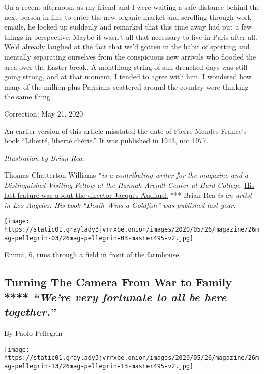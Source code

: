 On a recent afternoon, as my friend and I were waiting a safe distance
behind the next person in line to enter the new organic market and
scrolling through work emails, he looked up suddenly and remarked that
this time away had put a few things in perspective: Maybe it wasn't all
that necessary to live in Paris after all. We'd already laughed at the
fact that we'd gotten in the habit of spotting and mentally separating
ourselves from the conspicuous new arrivals who flooded the area over
the Easter break. A monthlong string of sun-drenched days was still
going strong, and at that moment, I tended to agree with him. I wondered
how many of the million-plus Parisians scattered around the country were
thinking the same thing.

Correction: May 21, 2020

An earlier version of this article misstated the date of Pierre Mendès
France's book ``Liberté, liberté chérie.'' It was published in 1943, not
1977.

\emph{Illustration by Brian Rea.}

Thomas Chatterton Williams *\emph{is a contributing writer for the
magazine and a Distinguished Visiting Fellow at the Hannah Arendt Center
at Bard College.}
\href{https://www.nytimes3xbfgragh.onion/2018/10/11/magazine/jacques-audiard-french-scorsese-sisters-brothers.html}{His
last feature was about the director Jacques Audiard.} *** Brian Rea
\emph{is an artist in Los Angeles. His book ``Death Wins a Goldfish''
was published last year.}

\texttt{[image: https://static01.graylady3jvrrxbe.onion/images/2020/05/26/magazine/26mag-pellegrin-03/26mag-pellegrin-03-master495-v2.jpg]}

Emma, 6, runs through a field in front of the farmhouse.

\hypertarget{turning-the-camera-from-war-to-family--were-very-fortunate-to-all-be-here-together}{%
\subsection{\texorpdfstring{Turning The Camera From War to Family ****
\emph{``We're very fortunate to all be here
together.''}}{Turning The Camera From War to Family **** ``We're very fortunate to all be here together.''}}\label{turning-the-camera-from-war-to-family--were-very-fortunate-to-all-be-here-together}}

By Paolo Pellegrin

\texttt{[image: https://static01.graylady3jvrrxbe.onion/images/2020/05/26/magazine/26mag-pellegrin-13/26mag-pellegrin-13-master495-v2.jpg]}

